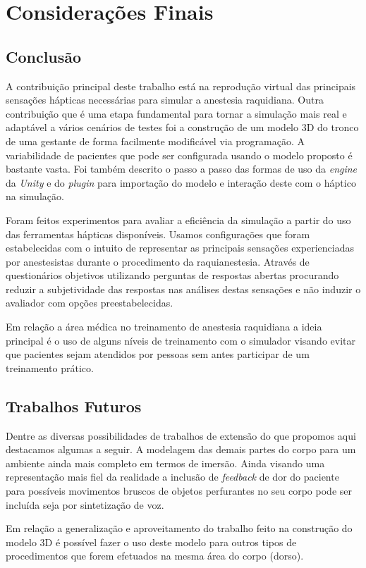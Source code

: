 \chapter{Considerações Finais} \label{cap:cap6}

\section{Conclusão}
\label{sec:conclusão}

A contribuição principal deste trabalho está na reprodução virtual das principais sensações hápticas necessárias para simular a anestesia raquidiana. Outra contribuição que é uma etapa fundamental para tornar a simulação mais real e adaptável a vários cenários de testes foi a construção de um modelo 3D do tronco de uma gestante de forma facilmente modificável via programação. A variabilidade de pacientes que pode ser configurada usando o modelo proposto é bastante vasta. Foi também descrito o passo a passo das formas de uso da \textit{engine} da \textit{Unity} e do \textit{plugin} para importação do modelo e interação deste com o háptico na simulação. 

Foram feitos experimentos para avaliar a eficiência da simulação a partir do uso das ferramentas hápticas disponíveis. Usamos configurações que foram estabelecidas com o intuito de representar as principais sensações experienciadas por anestesistas durante o procedimento da raquianestesia. Através de questionários objetivos utilizando perguntas de respostas abertas procurando reduzir a subjetividade das respostas nas análises destas sensações e não induzir o avaliador com opções preestabelecidas.  

Em relação a área médica no treinamento de anestesia raquidiana a ideia principal é o uso de alguns níveis de treinamento com o simulador visando evitar que pacientes sejam atendidos por pessoas sem antes participar de um treinamento prático.

\section{Trabalhos Futuros}
\label{sec:trabFuturo}

Dentre as diversas possibilidades de trabalhos de extensão do que propomos aqui destacamos algumas a seguir. A modelagem das demais partes do corpo para um ambiente ainda mais completo em termos de imersão. Ainda visando uma representação mais fiel da realidade a inclusão de \textit{feedback} de dor do paciente para possíveis movimentos bruscos de objetos perfurantes no seu corpo pode ser incluída seja por sintetização de voz.  

Em relação a generalização e aproveitamento do trabalho feito na construção do modelo 3D é possível fazer o uso deste modelo para outros tipos de procedimentos que forem efetuados na mesma área do corpo (dorso).